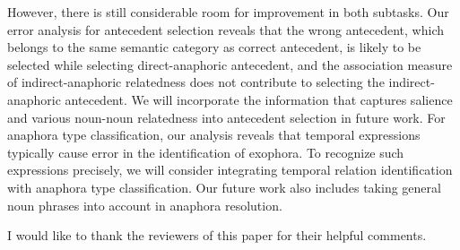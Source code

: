\documentclass[english]{jnlp_1.4}
\begin{document}
However, there is still considerable room for improvement in both
subtasks. Our error analysis for antecedent selection reveals that
the wrong antecedent, which belongs to the same semantic category as
correct antecedent, is likely to be selected while selecting
direct-anaphoric antecedent, and the association measure of
indirect-anaphoric relatedness does not contribute to selecting
the indirect-anaphoric antecedent. We will incorporate the information
that captures salience and various noun-noun relatedness into
antecedent selection in future work. For anaphora type
classification, our analysis reveals that temporal expressions
typically cause error in the identification of exophora. To recognize
such expressions precisely, we will consider integrating temporal
relation identification with anaphora type classification. Our future
work also includes taking general noun phrases into account in
anaphora resolution.





\acknowledgment

I would like to thank the reviewers of this
  paper for their helpful comments.
\end{document}
